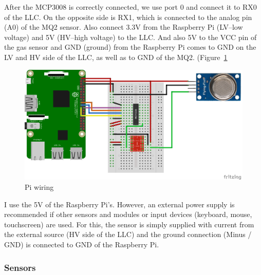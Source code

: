 \documentclass{article}\usepackage[]{graphicx}\usepackage[]{color}
\begin{document}
After the MCP3008 is correctly connected, we use port 0 and connect it to RX0 of the LLC. On the opposite side is RX1, which is connected to the analog pin (A0) of the MQ2 sensor. Also connect 3.3V from the Raspberry Pi (LV--low voltage) and 5V (HV--high voltage) to the LLC. And also 5V to the VCC pin of the gas sensor and GND (ground) from the Raspberry Pi comes to GND on the LV and HV side of the LLC, as well as to GND of the MQ2. (Figure~\ref{fig:Pi-MQ2}

\begin{figure}
\includegraphics[width=1.00\textwidth]{Raspberry-Pi-Gas-Sensor-MQ2.png}
\caption{Pi wiring}
\label{fig:Pi-MQ2}
\end{figure}

I use the 5V of the Raspberry Pi's. However, an external power supply is recommended if other sensors and modules or input devices (keyboard, mouse, touchscreen) are used. For this, the sensor is simply supplied with current from the external source (HV side of the LLC) and the ground connection (Minus / GND) is connected to GND of the Raspberry Pi.

\subsubsection{Sensors}
\end{document}
